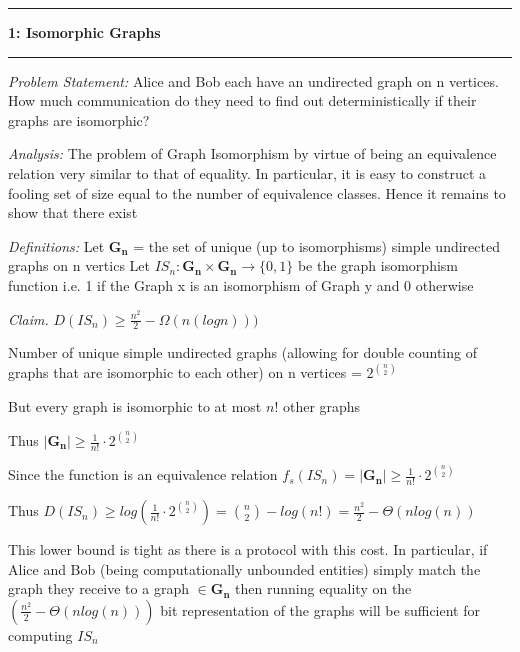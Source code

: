 \documentclass[11pt]{article}
\newcommand\question[2]{\vspace{.25in}\hrule\textbf{#1: #2}\vspace{.5em}\hrule\vspace{.10in}}
\newcommand\analysis{\vspace{.10in}\emph{Analysis: }\newline}
\newcommand\problem{\emph{Problem Statement:}\newline}
\newcommand\definitions{\emph{Definitions:}\newline}
\newcommand\claim{\emph{Claim.}\newline}
\begin{document}
\raggedright
\newcommand\NAME{Siddharth Joshi}  %
\newcommand\HWNUM{}              %


\question{1}{Isomorphic Graphs} 

\problem
Alice and Bob each have an undirected graph on n
vertices. How much communication do they need to find out deterministically if
their graphs are isomorphic?

\analysis
The problem of Graph Isomorphism by virtue of being an equivalence relation very similar to that of equality. In particular, it is easy to construct a fooling set of size equal to the number of equivalence classes. Hence it remains to show that there exist  \newline

\definitions
Let $\mathbf{G_n}$ = the set of unique (up to isomorphisms) simple undirected graphs on n vertics \newline
Let $IS_n: \mathbf{G_n} \times \mathbf{G_n} \to \{0, 1\}$ be the graph isomorphism function i.e. 1 if the Graph x is an isomorphism of Graph y and 0 otherwise
\newline

\claim
$ D(IS_n) \geq \frac{n^2}{2} - \Omega(n(logn))) $

\proof 
Number of unique simple undirected graphs (allowing for double counting of graphs that are isomorphic to each other) on n vertices = $2^{n \choose 2}$

But every graph is isomorphic to at most $n!$ other graphs

Thus $\vert\mathbf{G_n}\vert \geq \frac{1}{n!} \cdot 2^{{n \choose 2}}$

Since the function is an equivalence relation $f_s(IS_n) = \vert\mathbf{G_n}\vert \geq \frac{1}{n!} \cdot 2^{{n \choose 2}}$

Thus $D(IS_n) \geq log( \frac{1}{n!} \cdot 2^{{n \choose 2}}) = {n \choose 2} - log(n!) = \frac{n^2}{2} - \Theta({nlog(n)})$

This lower bound is tight as there is a protocol with this cost. In particular, if Alice and Bob (being computationally unbounded entities) simply match the graph they receive to a graph $\in \mathbf{G_n}$ then running equality on the $(\frac{n^2}{2} - \Theta({nlog(n)}))$ bit representation of the graphs will be sufficient for computing $IS_n$
\end{document}
